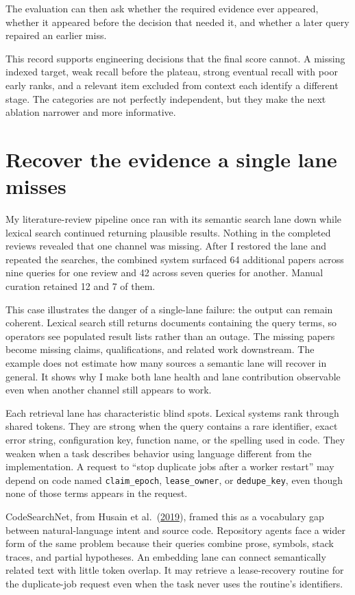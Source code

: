 The evaluation can then ask whether the required evidence ever appeared, whether it appeared before the decision that needed it, and whether a later query repaired an earlier miss.

This record supports engineering decisions that the final score cannot. A missing indexed target, weak recall before the plateau, strong eventual recall with poor early ranks, and a relevant item excluded from context each identify a different stage. The categories are not perfectly independent, but they make the next ablation narrower and more informative.

\hypertarget{recover-the-evidence-a-single-lane-misses}{%
\section{Recover the evidence a single lane misses}\label{recover-the-evidence-a-single-lane-misses}}

My literature-review pipeline once ran with its semantic search lane down while lexical search continued returning plausible results. Nothing in the completed reviews revealed that one channel was missing. After I restored the lane and repeated the searches, the combined system surfaced 64 additional papers across nine queries for one review and 42 across seven queries for another. Manual curation retained 12 and 7 of them.

This case illustrates the danger of a single-lane failure: the output can remain coherent. Lexical search still returns documents containing the query terms, so operators see populated result lists rather than an outage. The missing papers become missing claims, qualifications, and related work downstream. The example does not estimate how many sources a semantic lane will recover in general. It shows why I make both lane health and lane contribution observable even when another channel still appears to work.

Each retrieval lane has characteristic blind spots. Lexical systems rank through shared tokens. They are strong when the query contains a rare identifier, exact error string, configuration key, function name, or the spelling used in code. They weaken when a task describes behavior using language different from the implementation. A request to ``stop duplicate jobs after a worker restart'' may depend on code named \texttt{claim\_epoch}, \texttt{lease\_owner}, or \texttt{dedupe\_key}, even though none of those terms appears in the request.

CodeSearchNet, from Husain et al.~(\href{https://arxiv.org/abs/1909.09436}{2019}), framed this as a vocabulary gap between natural-language intent and source code. Repository agents face a wider form of the same problem because their queries combine prose, symbols, stack traces, and partial hypotheses. An embedding lane can connect semantically related text with little token overlap. It may retrieve a lease-recovery routine for the duplicate-job request even when the task never uses the routine's identifiers.

